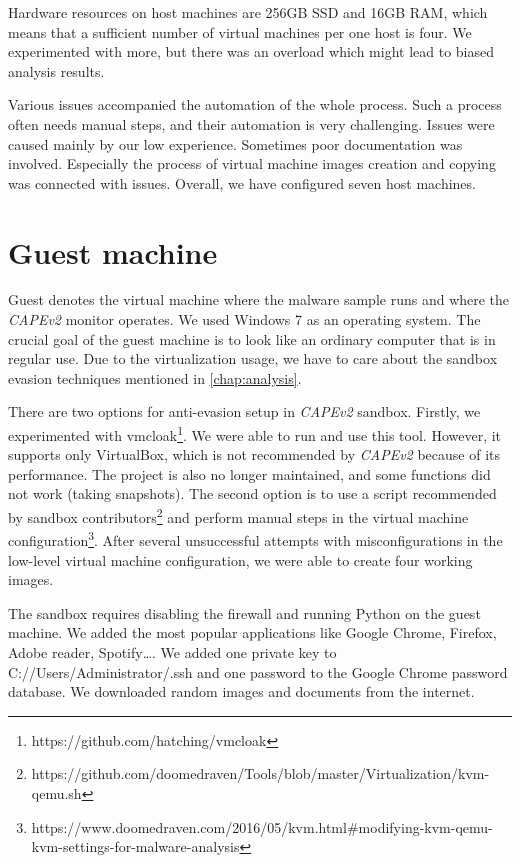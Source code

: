 Hardware resources on host machines are 256GB SSD and 16GB RAM, which means that a sufficient number of virtual machines per one host is four. We experimented with more, but there was an overload which might lead to biased analysis results.

Various issues accompanied the automation of the whole process. Such a process often needs manual steps, and their automation is very challenging. Issues were caused mainly by our low experience. Sometimes poor documentation was involved. Especially the process of virtual machine images creation and copying was connected with issues. Overall, we have configured seven host machines.

\section{Guest machine}
Guest denotes the virtual machine where the malware sample runs and where the \emph{CAPEv2} monitor operates. We used Windows 7 as an operating system. The crucial goal of the guest machine is to look like an ordinary computer that is in regular use. Due to the virtualization usage, we have to care about the sandbox evasion techniques mentioned in \ref{chap:analysis}.

There are two options for anti-evasion setup in \emph{CAPEv2} sandbox. Firstly, we experimented with vmcloak\footnote{https://github.com/hatching/vmcloak}. We were able to run and use this tool. However, it supports only VirtualBox, which is not recommended by \emph{CAPEv2} because of its performance. The project is also no longer maintained, and some functions did not work (taking snapshots). The second option is to use a script recommended by sandbox contributors\footnote{https://github.com/doomedraven/Tools/blob/master/Virtualization/kvm-qemu.sh} and perform manual steps in the virtual machine configuration\footnote{https://www.doomedraven.com/2016/05/kvm.html\#modifying-kvm-qemu-kvm-settings-for-malware-analysis}. After several unsuccessful attempts with misconfigurations in the low-level virtual machine configuration, we were able to create four working images.

The sandbox requires disabling the firewall and running Python on the guest machine. We added the most popular applications like Google Chrome, Firefox, Adobe reader, Spotify\dots. We added one private key to C://Users/Administrator/.ssh and one password to the Google Chrome password database. We downloaded random images and documents from the internet.

